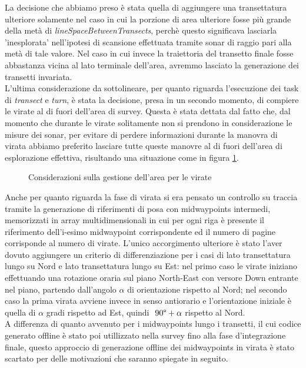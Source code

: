 \documentclass{article}
\begin{document}
                La decisione che abbiamo preso è stata quella di aggiungere una transettatura ulteriore solamente nel caso in cui la porzione di area ulteriore
                fosse più grande della metà di \emph{lineSpaceBetweenTransects},
                perchè questo significava lasciarla 'inesplorata' nell'ipotesi di scansione effettuata tramite sonar di raggio pari alla metà di tale valore.
                Nel caso in cui invece la traiettoria del transetto finale fosse abbastanza
                vicina al lato terminale dell'area, avremmo lasciato la generazione dei transetti invariata.\\

                L'ultima considerazione da sottolineare, per quanto riguarda l'esecuzione dei task di \emph{transect} e \emph{turn}, 
                è stata la decisione, presa in un secondo momento, di compiere le virate al di fuori dell'area di survey.
                Questa è stata dettata dal fatto che, dal momento che durante le virate solitamente non si prendono in considerazione le misure dei sonar,
                per evitare di perdere informazioni durante la manovra di virata abbiamo preferito lasciare tutte queste manovre al di fuori 
                dell'area di esplorazione effettiva, risultando una situazione come in figura \ref{fig:virata}.

                \begin{figure} [ht]
                    \caption{Considerazioni sulla gestione dell'area per le virate}
                    \label{fig:virata}
                \end{figure}
                    
                Anche per quanto riguarda la fase di virata si era pensato un controllo su traccia tramite la generazione di riferimenti 
                di posa con midwaypoints intermedi, memorizzati in array multidimensionali in cui per ogni riga 
                è presente il riferimento dell'i-esimo midwaypoint corrispondente ed il numero di pagine corrisponde al numero di virate.
                L'unico accorgimento ulteriore è stato l'aver dovuto aggiungere un criterio di differenziazione per i casi di lato transettatura lungo
                su Nord e lato transettatura lungo su Est: nel primo caso le virate iniziano effettuando una rotazione oraria sul piano North-East con versore Down
                entrante nel piano, partendo dall'angolo $\alpha$
                di orientazione rispetto al Nord; nel secondo caso la prima virata avviene invece in senso antiorario e l'orientazione
                iniziale è quella di $\alpha$ gradi rispetto ad Est, quindi $\ 90 \degree + \alpha$ rispetto al Nord.\\
                A differenza di quanto avvenuto per i midwaypoints lungo i transetti, il cui codice generato offline è stato poi utillizzato nella survey fino alla fase 
                d'integrazione finale, questo approccio di generazione offline dei midwaypoints in virata è stato scartato per delle motivazioni che saranno spiegate 
                in seguito.\\
\end{document}
